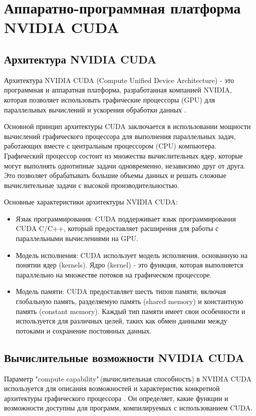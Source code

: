 \documentclass[a4paper, final]{article}
\begin{document}
\section{Аппаратно-программная платформа NVIDIA CUDA}
    \subsection{Архитектура NVIDIA CUDA}
    Архитектура NVIDIA CUDA (Compute Unified Device Architecture) - это программная и аппаратная платформа, разработанная компанией NVIDIA, которая позволяет использовать графические процессоры (GPU) для параллельных вычислений и ускорения обработки данных \cite{cuda_tech}.
    
    Основной принцип архитектуры CUDA заключается в использовании мощности вычислений графического процессора для выполнения параллельных задач, работающих вместе с центральным процессором (CPU) компьютера. Графический процессор состоит из множества вычислительных ядер, которые могут выполнять однотипные задачи одновременно, независимо друг от друга. Это позволяет обрабатывать большие объемы данных и решать сложные вычислительные задачи с высокой производительностью.
    
    Основные характеристики архитектуры NVIDIA CUDA:
    \begin{itemize}
        \item Язык программирования: CUDA поддерживает язык программирования CUDA C/C++, который предоставляет расширения для работы с параллельными вычислениями на GPU. 
        \item Модель исполнения: CUDA использует модель исполнения, основанную на понятии ядер (kernels). Ядро (kernel) - это функция, которая выполняется параллельно на множестве потоков на графическом процессоре.
        \item Модель памяти: CUDA предоставляет шесть типов памяти, включая глобальную память, разделяемую память (shared memory) и константную память (constant memory). Каждый тип памяти имеет свои особенности и используется для различных целей, таких как обмен данными между потоками и сохранение постоянных данных.
    \end{itemize}
    \subsection{Вычислительные возможности NVIDIA CUDA}
    Параметр "compute capability"\,(вычислительная способность) в NVIDIA CUDA используется для описания возможностей и характеристик конкретной архитектуры графического процессора \cite{cuda_guide}. Он определяет, какие функции и возможности доступны для программ, компилируемых с использованием CUDA.
    
\end{document}
